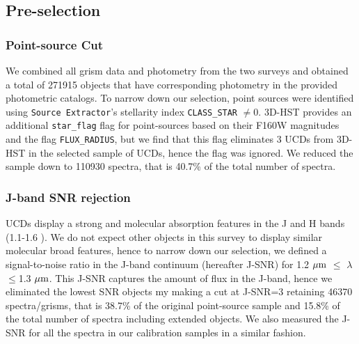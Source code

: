 \documentclass[manuscript]{aastex63}
\begin{document}
\subsection{Pre-selection}
\subsubsection{Point-source Cut}
We combined all grism data and photometry from the two surveys and obtained a total of 271915 objects that have corresponding photometry in the provided photometric catalogs. To narrow down our selection, point sources were identified using \texttt{Source Extractor}'s stellarity index \texttt{CLASS\_STAR} $\neq$0. 3D-HST provides an additional \texttt{star\_flag} flag for point-sources based on their F160W magnitudes and the flag \texttt{FLUX\_RADIUS}, but we find that this flag eliminates 3 UCDs from 3D-HST in the selected sample of UCDs, hence the flag was ignored. We reduced the sample down to 110930 spectra, that is 40.7\% of the total number of spectra.


\subsubsection{J-band SNR rejection }
UCDs display a strong \wat and \meth molecular absorption features in the J and H bands (1.1-1.6 \micron). We do not expect other objects in this survey to display similar molecular broad features, hence to narrow down our selection, we defined a signal-to-noise ratio in the J-band continuum (hereafter J-SNR) for 1.2 $\mbox{$\mu$m}$ $\leq$ $\lambda$ $\leq$1.3 $\mbox{$\mu$m}$. This J-SNR captures the amount of flux in the J-band, hence we eliminated the lowest SNR objects my making a cut at J-SNR=3 retaining 46370 spectra/grisms, that is 38.7\% of the original point-source sample and 15.8\% of the total number of spectra including extended objects. We also measured the J-SNR for all the spectra in our calibration samples in a similar fashion.
\end{document}
